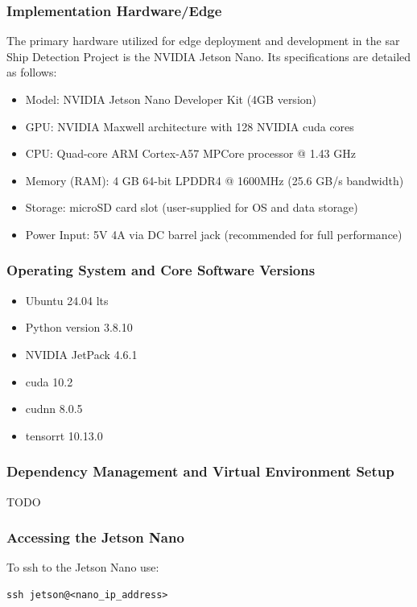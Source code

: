 \documentclass{article}
\begin{document}
\subsubsection{Implementation Hardware/Edge}
The primary hardware utilized for edge deployment and development in the \acrshort{sar} Ship
Detection Project is the NVIDIA Jetson Nano. Its specifications are detailed as follows:
\begin{itemize}
    \item Model: NVIDIA Jetson Nano Developer Kit (4GB version)
    \item GPU: NVIDIA Maxwell architecture with 128 NVIDIA \acrshort{cuda} cores
    \item CPU: Quad-core ARM Cortex-A57 MPCore processor @ 1.43 GHz
    \item Memory (RAM): 4 GB 64-bit LPDDR4 @ 1600MHz (25.6 GB/s bandwidth)
    \item Storage: microSD card slot (user-supplied for OS and data storage)
    \item Power Input: 5V 4A via DC barrel jack (recommended for full performance)
\end{itemize}

\subsubsection{Operating System and Core Software Versions}
\begin{itemize}
    \item Ubuntu 24.04 \acrshort{lts}
    \item Python version 3.8.10
    \item NVIDIA JetPack 4.6.1
    \item \acrshort{cuda} 10.2
    \item \acrshort{cudnn} 8.0.5
    \item \acrshort{tensorrt} 10.13.0
\end{itemize}

\subsubsection{Dependency Management and Virtual Environment Setup}
TODO

\subsubsection{Accessing the Jetson Nano}
To ssh to the Jetson Nano use:
\begin{lstlisting}
ssh jetson@<nano_ip_address>
\end{lstlisting}
\end{document}
